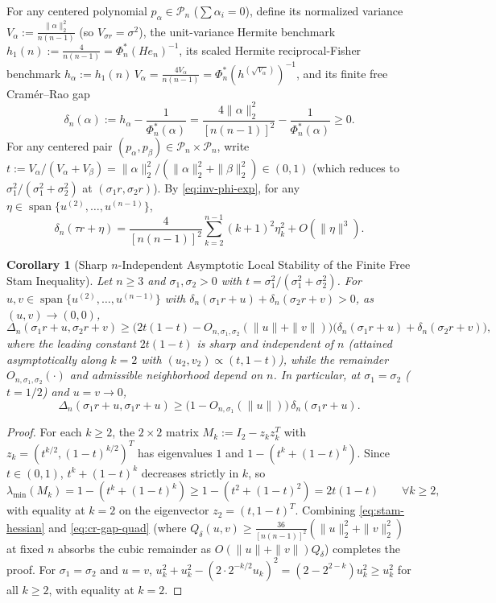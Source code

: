 \documentclass[11pt,a4paper]{article}
\newtheorem{corollary}[theorem]{Corollary}
\theoremstyle{definition}
\DeclareMathOperator{\Span}{span}
\begin{document}
For any centered polynomial $p_\alpha \in \mathcal{P}_n$ ($\sum \alpha_i = 0$), define its normalized variance $V_\alpha := \frac{\|\alpha\|_2^2}{n(n-1)}$ (so $V_{\sigma r} = \sigma^2$), the unit-variance Hermite benchmark $h_1(n) := \frac{4}{n(n-1)} = \Phi_n^*(He_n)^{-1}$, its scaled Hermite reciprocal-Fisher benchmark $h_\alpha := h_1(n)\, V_\alpha = \frac{4 V_\alpha}{n(n-1)} = \Phi_n^*(h^{(\sqrt{V_\alpha})})^{-1}$, and its finite free Cram\'er--Rao gap
\[
\delta_n(\alpha) := h_\alpha - \frac{1}{\Phi_n^*(\alpha)} = \frac{4 \|\alpha\|_2^2}{[n(n-1)]^2} - \frac{1}{\Phi_n^*(\alpha)} \ge 0.
\]
For any centered pair $(p_\alpha, p_\beta) \in \mathcal{P}_n \times \mathcal{P}_n$, write $t := V_\alpha / (V_\alpha + V_\beta) = \|\alpha\|_2^2 / (\|\alpha\|_2^2 + \|\beta\|_2^2) \in (0, 1)$ (which reduces to $\sigma_1^2/(\sigma_1^2 + \sigma_2^2)$ at $(\sigma_1 r, \sigma_2 r)$). By \eqref{eq:inv-phi-exp}, for any $\eta \in \Span\{u^{(2)}, \dots, u^{(n-1)}\}$,
\begin{equation}
\label{eq:cr-gap-quad}
\delta_n(\tau r + \eta) = \frac{4}{[n(n-1)]^2} \sum_{k=2}^{n-1} (k+1)^2 \eta_k^2 + O(\|\eta\|^3).
\end{equation}

\begin{corollary}[Sharp $n$-Independent Asymptotic Local Stability of the Finite Free Stam Inequality]
\label{cor:stability}
Let $n \ge 3$ and $\sigma_1, \sigma_2 > 0$ with $t = \sigma_1^2/(\sigma_1^2+\sigma_2^2)$. For $u, v \in \Span\{u^{(2)}, \dots, u^{(n-1)}\}$ with $\delta_n(\sigma_1 r + u) + \delta_n(\sigma_2 r + v) > 0$, as $(u, v) \to (0, 0)$,
\[
\Delta_n(\sigma_1 r + u, \sigma_2 r + v) \ge \Big( 2t(1-t) - O_{n,\sigma_1,\sigma_2}(\|u\| + \|v\|) \Big) \big( \delta_n(\sigma_1 r + u) + \delta_n(\sigma_2 r + v) \big),
\]
where the leading constant $2t(1-t)$ is sharp and independent of $n$ (attained asymptotically along $k = 2$ with $(u_2, v_2) \propto (t, 1-t)$), while the remainder $O_{n,\sigma_1,\sigma_2}(\cdot)$ and admissible neighborhood depend on $n$. In particular, at $\sigma_1 = \sigma_2$ ($t = 1/2$) and $u = v \to 0$,
\[
\Delta_n(\sigma_1 r + u, \sigma_1 r + u) \ge \big(1 - O_{n,\sigma_1}(\|u\|)\big)\, \delta_n(\sigma_1 r + u).
\]
\end{corollary}

\begin{proof}
For each $k \ge 2$, the $2 \times 2$ matrix $M_k := I_2 - z_k z_k^T$ with $z_k = (t^{k/2}, (1-t)^{k/2})^T$ has eigenvalues $1$ and $1 - (t^k + (1-t)^k)$. Since $t \in (0,1)$, $t^k + (1-t)^k$ decreases strictly in $k$, so
\[
\lambda_{\min}(M_k) = 1 - (t^k + (1-t)^k) \ge 1 - (t^2 + (1-t)^2) = 2t(1-t) \qquad \forall k \ge 2,
\]
with equality at $k = 2$ on the eigenvector $z_2 = (t, 1-t)^T$. Combining \eqref{eq:stam-hessian} and \eqref{eq:cr-gap-quad} (where $Q_\delta(u,v) \ge \frac{36}{[n(n-1)]^2}(\|u\|_2^2 + \|v\|_2^2)$ at fixed $n$ absorbs the cubic remainder as $O(\|u\| + \|v\|)Q_\delta$) completes the proof. For $\sigma_1 = \sigma_2$ and $u = v$, $u_k^2 + u_k^2 - (2 \cdot 2^{-k/2} u_k)^2 = (2 - 2^{2-k}) u_k^2 \ge u_k^2$ for all $k \ge 2$, with equality at $k = 2$.
\end{proof}
\end{document}
